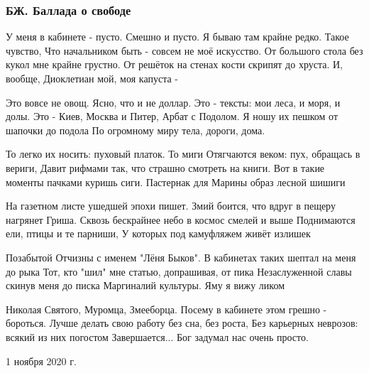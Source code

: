  
 
 

\subsubsection{БЖ. Баллада о свободе}
\label{sec:poetry.rus.evgenija_bilchenko.ballada_o_svobode}


У меня в кабинете - пусто. Смешно и пусто.
Я бываю там крайне редко. Такое чувство,
Что начальником быть - совсем не моё искусство.
От большого стола без кукол мне крайне грустно.
От решёток на стенах кости скрипят до хруста.
И, вообще, Диоклетиан мой, моя капуста - 

Это вовсе не овощ. Ясно, что и не доллар.
Это - тексты: мои леса, и моря, и долы.
Это - Киев, Москва и Питер, Арбат с Подолом.
Я ношу их пешком от шапочки до подола
По огромному миру тела, дороги, дома.

То легко их носить: пуховый платок. То миги
Отягчаются веком: пух, обращась в вериги,
Давит рифмами так, что страшно смотреть на книги.
Вот в такие моменты пачками куришь сиги.
Пастернак для Марины образ лесной шишиги

На газетном листе ушедшей эпохи пишет.
Змий боится, что вдруг в пещеру нагрянет Гриша.
Сквозь бескрайнее небо в космос смелей и выше
Поднимаются ели, птицы и те парниши,
У которых под камуфляжем живёт излишек

Позабытой Отчизны с именем "Лёня Быков".
В кабинетах таких шептал на меня до рыка
Тот, кто "шил" мне статью, допрашивая, от пика
Незаслуженной славы скинув меня до писка
Маргиналий культуры. Яму я вижу ликом

Николая Святого, Муромца, Змееборца.
Посему в кабинете этом грешно - бороться.
Лучше делать свою работу без сна, без роста,
Без карьерных неврозов: всякий из них погостом
Завершается... Бог задумал нас очень просто.

1 ноября 2020 г.
